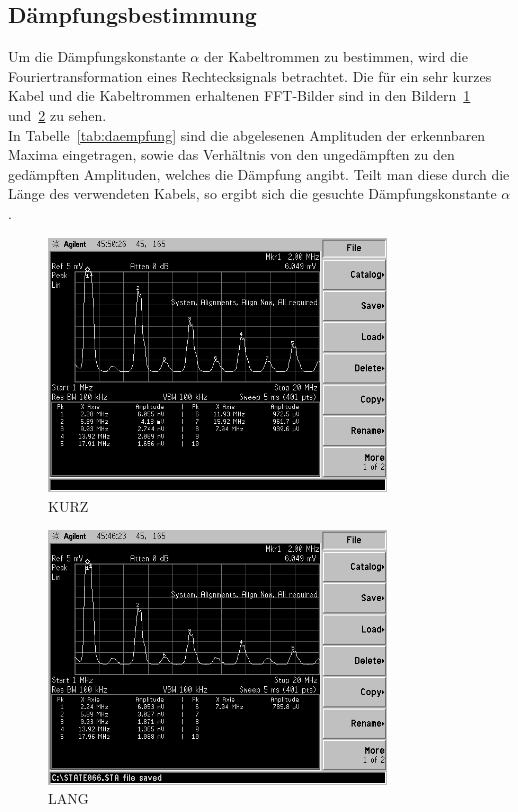 \subsection{Dämpfungsbestimmung}
%
Um die Dämpfungskonstante $\alpha$ der Kabeltrommen zu bestimmen, 
wird die Fouriertransformation eines Rechtecksignals betrachtet. Die 
für ein sehr kurzes Kabel und die Kabeltrommen erhaltenen FFT-Bilder 
sind in den Bildern~\ref{fig:daempfung_kurz} 
und~\ref{fig:daempfung_lang} zu sehen.\\
In Tabelle~\ref{tab:daempfung} sind die abgelesenen Amplituden der 
erkennbaren Maxima eingetragen, sowie das Verhältnis von den 
ungedämpften zu den gedämpften Amplituden, welches die 
Dämpfung angibt. Teilt man diese durch die Länge des verwendeten 
Kabels, so ergibt sich die gesuchte Dämpfungskonstante $\alpha$.
%
\begin{figure}[]
\centering
\includegraphics[width=0.8\textwidth]{daempfung_kurz.png}
\caption{KURZ}
\label{fig:daempfung_kurz}
\end{figure}
%
\begin{figure}[]
\centering
\includegraphics[width=0.8\textwidth]{daempfung_lang.png}
\caption{LANG}
\label{fig:daempfung_lang}
\end{figure}
